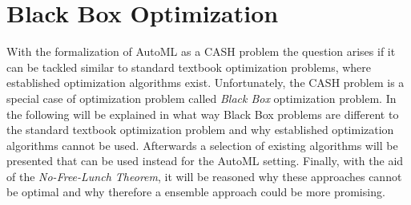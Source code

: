 \section{Black Box Optimization}
\label{sec:theory:optimization}
With the formalization of AutoML as a CASH problem the question arises if it can be tackled similar to standard textbook optimization problems, where established optimization algorithms exist.
Unfortunately, the CASH problem is a special case of optimization problem called \textit{Black Box} optimization problem.\newline
In the following will be explained in what way Black Box problems are different to the standard textbook optimization problem and why established optimization algorithms cannot be used.
Afterwards a selection of existing algorithms will be presented that can be used instead for the AutoML setting.
Finally, with the aid of the \textit{No-Free-Lunch Theorem}, it will be reasoned why these approaches cannot be optimal and why therefore a ensemble approach could be more promising.

